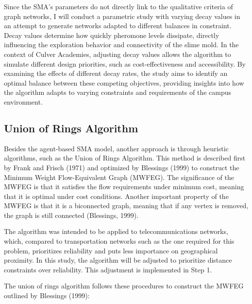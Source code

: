 \documentclass[11pt]{article}
\begin{document}
Since the SMA's parameters do not directly link to the qualitative criteria of graph networks, I will conduct a parametric study with varying decay values in an attempt to generate networks adapted to different balances in constraint. Decay values determine how quickly pheromone levels dissipate, directly influencing the exploration behavior and connectivity of the slime mold. In the context of Culver Academies, adjusting decay values allows the algorithm to simulate different design priorities, such as cost-effectiveness and accessibility. By examining the effects of different decay rates, the study aims to identify an optimal balance between these competing objectives, providing insights into how the algorithm adapts to varying constraints and requirements of the campus environment. \par
\subsection{Union of Rings Algorithm}
Besides the agent-based SMA model, another approach is through heuristic algorithms, such as the Union of Rings Algorithm. This method is described first by Frank and Frisch (1971) and optimized by Blessings (1999) to construct the Minimum Weight Flow-Equivalent Graph (MWFEG). The significance of the MWFEG is that it satisfies the flow requirements under minimum cost, meaning that it is optimal under cost conditions. Another important property of the MWFEG is that it is a biconnected graph, meaning that if any vertex is removed, the graph is still connected (Blessings, 1999). \par
	The algorithm was intended to be applied to telecommunications networks, which, compared to transportation networks such as the one required for this problem, prioritizes reliability and puts less importance on geographical proximity. In this study, the algorithm will be adjusted to prioritize distance constraints over reliability. This adjustment is implemented in Step 1.  \par
The union of rings algorithm follows these procedures to construct the MWFEG outlined by Blessings (1999): \\
\end{document}
